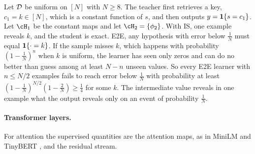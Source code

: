 \begin{example}\label{ex:retrieval}
\Pv\Ck Let $\mathcal{D}$ be uniform on $[N]$ with $N\ge8$. The teacher first retrieves a key, $c_1=k\in[N]$, which is a constant function
of $s$, and then outputs $y=\mathbf{1}\{s=c_1\}$. Let $\cH_1$ be the constant maps and let $\cH_2=\{\phi_2\}$. With IS, one example reveals
$k$, and the student is exact. E2E, any hypothesis with error below $\frac1N$ must equal $\mathbf{1}\{\cdot=k\}$. If the sample misses
$k$, which happens with probability $(1-\frac1N)^n$ when $k$ is uniform, the learner has seen only zeros and can do no better
than guess among at least $N-n$ unseen values. So every E2E learner with $n\le N/2$ examples fails to reach error below $\frac1N$
with probability at least $(1-\frac1N)^{N/2}(1-\frac2N)\ge\frac14$ for some $k$. The intermediate value reveals in one example what
the output reveals only on an event of probability $\frac1N$.
\end{example}

\paragraph{Transformer layers.}
For attention the supervised quantities are the attention maps, as in MiniLM and TinyBERT
\citep{wang2020minilm,jiao2020tinybert}, and the residual stream.

